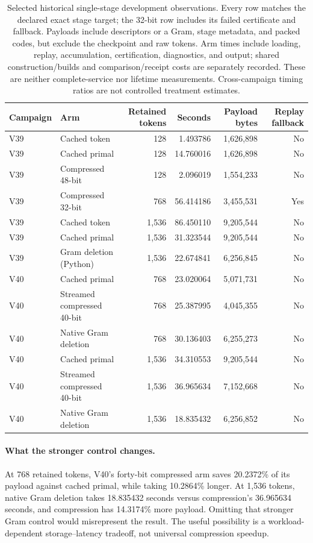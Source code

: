 \documentclass[10pt,twocolumn,letterpaper]{article}
\begin{document}
\begin{table}[t]
\centering
\small
\begin{tabular}{llrrrr}
\toprule
Campaign & Arm & Retained tokens & Seconds & Payload bytes & Replay fallback\\
\midrule
V39 & Cached token &128&1.493786&1,626,898&No\\
V39 & Cached primal &128&14.760016&1,626,898&No\\
V39 & Compressed 48-bit &128&2.096019&1,554,233&No\\
V39 & Compressed 32-bit &768&56.414186&3,455,531&Yes\\
V39 & Cached token &1,536&86.450110&9,205,544&No\\
V39 & Cached primal &1,536&31.323544&9,205,544&No\\
V39 & Gram deletion (Python) &1,536&22.674841&6,256,845&No\\
\midrule
V40 & Cached primal &768&23.020064&5,071,731&No\\
V40 & Streamed compressed 40-bit &768&25.387995&4,045,355&No\\
V40 & Native Gram deletion &768&30.136403&6,255,273&No\\
V40 & Cached primal &1,536&34.310553&9,205,544&No\\
V40 & Streamed compressed 40-bit &1,536&36.965634&7,152,668&No\\
V40 & Native Gram deletion &1,536&18.835432&6,256,852&No\\
\bottomrule
\end{tabular}
\caption{Selected historical single-stage development observations. Every row
matches the declared exact stage target; the 32-bit row includes its failed
certificate and fallback. Payloads include descriptors or a Gram, stage metadata,
and packed codes, but exclude the checkpoint and raw tokens. Arm times include
loading, replay, accumulation, certification, diagnostics, and output; shared
construction/builds and comparison/receipt costs are separately recorded. These
are neither complete-service nor lifetime measurements. Cross-campaign timing
ratios are not controlled treatment estimates.}
\label{tab:history}
\end{table}

\paragraph{What the stronger control changes.}
At 768 retained tokens, V40's forty-bit compressed arm saves 20.2372\% of its
payload against cached primal, while taking 10.2864\% longer. At 1,536 tokens,
native Gram deletion takes 18.835432 seconds versus compression's 36.965634
seconds, and compression has 14.3174\% more payload. Omitting that stronger Gram
control would misrepresent the result. The useful possibility is a
workload-dependent storage--latency tradeoff, not universal compression speedup.
\end{document}
